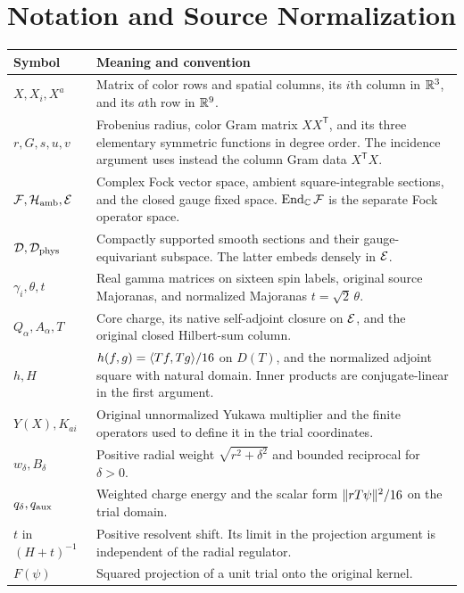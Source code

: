 \chapter{Notation and Source Normalization}\label{app:notation}
\small
\begin{longtable}{@{}p{}p{}@{}}
\toprule Symbol & Meaning and convention\\
\midrule
\endhead
$X,X_i,X^a$ & Matrix of color rows and spatial columns, its $i$th column in $\mathbb R^3$, and its $a$th row in $\mathbb R^9$.\\
$r,G,s,u,v$ & Frobenius radius, color Gram matrix $XX^{\mathsf T}$, and its three elementary symmetric functions in degree order. The incidence argument uses instead the column Gram data $X^{\mathsf T}X$.\\
$\mathcal F,\mathcal H_{\mathrm{amb}},\mathcal E$ & Complex Fock vector space, ambient square-integrable sections, and the closed gauge fixed space. $\operatorname{End}_\mathbb C\mathcal F$ is the separate Fock operator space.\\
$\mathcal D,\mathcal D_{\mathrm{phys}}$ & Compactly supported smooth sections and their gauge-equivariant subspace. The latter embeds densely in $\mathcal E$.\\
$\gamma_i,\theta,t$ & Real gamma matrices on sixteen spin labels, original source Majoranas, and normalized Majoranas $t=\sqrt2\,\theta$.\\
$Q_\alpha,A_\alpha,T$ & Core charge, its native self-adjoint closure on $\mathcal E$, and the original closed Hilbert-sum column.\\
$h,H$ & $h(f,g)=\langle Tf,Tg\rangle/16$ on $D(T)$, and the normalized adjoint square with natural domain. Inner products are conjugate-linear in the first argument.\\
$Y(X),K_{ai}$ & Original unnormalized Yukawa multiplier and the finite operators used to define it in the trial coordinates.\\
$w_\delta,B_\delta$ & Positive radial weight $\sqrt{r^2+\delta^2}$ and bounded reciprocal for $\delta>0$.\\
$q_\delta,q_{\rm aux}$ & Weighted charge energy and the scalar form $\lVert rT\psi\rVert^2/16$ on the trial domain.\\
$t$ in $(H+t)^{-1}$ & Positive resolvent shift. Its limit in the projection argument is independent of the radial regulator.\\
$F(\psi)$ & Squared projection of a unit trial onto the original kernel.\\
\bottomrule
\end{longtable}
\normalsize

